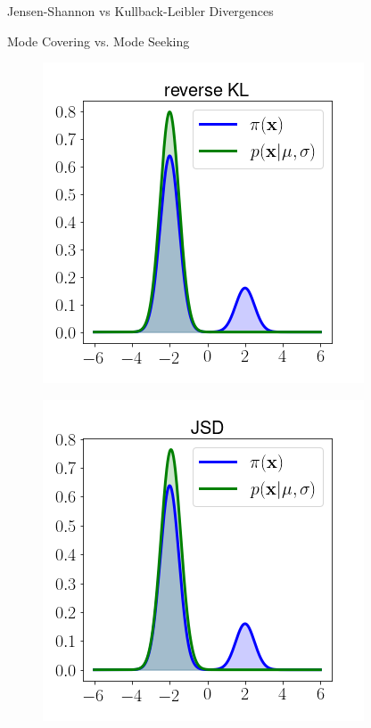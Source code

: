 \documentclass{beamer}
\begin{document}
\begin{frame}{Jensen-Shannon vs Kullback-Leibler Divergences}
\begin{block}{Mode Covering vs. Mode Seeking}
\begin{minipage}[t]{0.33\columnwidth}
\begin{figure}
				\includegraphics[width=\linewidth]{figs/reverse_KL}
			\end{figure}
		\end{minipage}%
		\begin{minipage}[t]{0.33\columnwidth}
			\begin{figure}
				\includegraphics[width=\linewidth]{figs/JSD}
			\end{figure}
		\end{minipage}
		\vspace{-0.3cm}
	\end{block}
\end{frame}
\end{document}
